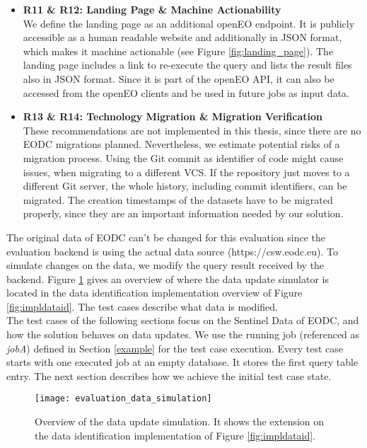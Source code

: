 \documentclass[draft,final]{vutinfth} %
\begin{document}
\begin{itemize}
	\item \textbf{R11 \& R12: Landing Page \& Machine Actionability} \\
	We define the landing page as an additional openEO endpoint. It is publicly accessible {as a human readable website and additionally} in JSON format, which makes it machine actionable {(see Figure \ref{fig:landing_page})}. The landing page includes a link to re-execute the query and lists the result files also in JSON format. Since it is part of the openEO API, it can also be accessed from the openEO clients and be used in future jobs as input data.
	\item \textbf{R13 \& R14: Technology Migration \& Migration Verification} \\
	These recommendations are not implemented in this thesis, since there are no EODC migrations planned. {Nevertheless, we estimate potential risks of a migration process. Using the Git commit as identifier of code might cause issues, when migrating to a different VCS. If the repository just moves to a different Git server, the whole history, including commit identifiers, can be migrated. The creation timestamps of the datasets have to be migrated properly, since they are an important information needed by our solution.}
\end{itemize}

The original data of EODC can't be changed for this evaluation since the evaluation backend is using the actual data source (https://csw.eodc.eu). To simulate changes on the data, we modify the query result received by the backend. Figure \ref{fig:eva_data_simulation} gives an overview of where the data update simulator is located in the data identification implementation overview of Figure \ref{fig:impldataid}. The test cases describe what data is modified. \\
The test cases of the following sections focus on the Sentinel Data of EODC, and how the solution behaves on data updates. We use the running job (referenced as \textit{jobA}) defined in Section \ref{example} for the test case execution. Every test case starts with one executed job at an empty database. It stores the first query table entry. The next section describes how we achieve the initial test case state.

\begin{figure}[h]
	\centering
	\texttt{[image: evaluation\_data\_simulation]}
	\caption{Overview of the data update simulation. It shows the extension on the data identification implementation of Figure \ref{fig:impldataid}.}
	\label{fig:eva_data_simulation} %
\end{figure}
\end{document}
